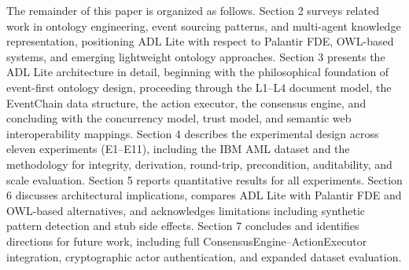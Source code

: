 The remainder of this paper is organized as follows. Section 2 surveys related work in ontology engineering, event sourcing patterns, and multi-agent knowledge representation, positioning ADL Lite with respect to Palantir FDE, OWL-based systems, and emerging lightweight ontology approaches. Section 3 presents the ADL Lite architecture in detail, beginning with the philosophical foundation of event-first ontology design, proceeding through the L1--L4 document model, the EventChain data structure, the action executor, the consensus engine, and concluding with the concurrency model, trust model, and semantic web interoperability mappings. Section 4 describes the experimental design across eleven experiments (E1--E11), including the IBM AML dataset and the methodology for integrity, derivation, round-trip, precondition, auditability, and scale evaluation. Section 5 reports quantitative results for all experiments. Section 6 discusses architectural implications, compares ADL Lite with Palantir FDE and OWL-based alternatives, and acknowledges limitations including synthetic pattern detection and stub side effects. Section 7 concludes and identifies directions for future work, including full ConsensusEngine--ActionExecutor integration, cryptographic actor authentication, and expanded dataset evaluation.
